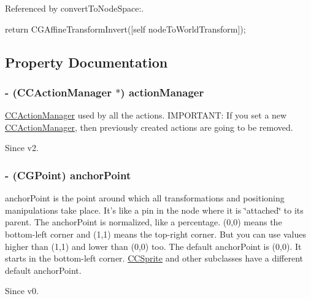 Referenced by convert\-To\-Node\-Space\-:.


\begin{DoxyCode}
{
        return CGAffineTransformInvert([self nodeToWorldTransform]);
}
\end{DoxyCode}


\subsection{Property Documentation}
\hypertarget{class_c_c_node_a23baea124da6113f8c3fe95b6f8eaa52}{
\subsubsection[{action\-Manager}]{\setlength{\rightskip}{0pt plus 5cm}-\/ ({\bf C\-C\-Action\-Manager} $\ast$) {\bf action\-Manager}}}\label{class_c_c_node_a23baea124da6113f8c3fe95b6f8eaa52}
\hyperlink{interface_c_c_action_manager}{C\-C\-Action\-Manager} used by all the actions. I\-M\-P\-O\-R\-T\-A\-N\-T\-: If you set a new \hyperlink{interface_c_c_action_manager}{C\-C\-Action\-Manager}, then previously created actions are going to be removed. \begin{DoxySince}{Since}
v2. 
\end{DoxySince}
\hypertarget{class_c_c_node_ac24fc742eb11ee96207052639224434c}{
\subsubsection[{anchor\-Point}]{\setlength{\rightskip}{0pt plus 5cm}-\/ (C\-G\-Point) {\bf anchor\-Point}}}\label{class_c_c_node_ac24fc742eb11ee96207052639224434c}
anchor\-Point is the point around which all transformations and positioning manipulations take place. It's like a pin in the node where it is \char`\"{}attached\char`\"{} to its parent. The anchor\-Point is normalized, like a percentage. (0,0) means the bottom-\/left corner and (1,1) means the top-\/right corner. But you can use values higher than (1,1) and lower than (0,0) too. The default anchor\-Point is (0,0). It starts in the bottom-\/left corner. \hyperlink{class_c_c_sprite}{C\-C\-Sprite} and other subclasses have a different default anchor\-Point. \begin{DoxySince}{Since}
v0. 
\end{DoxySince}


